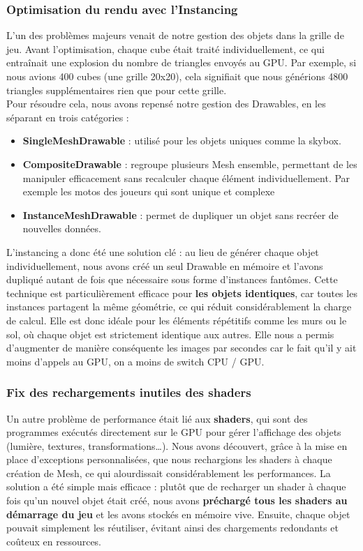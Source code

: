 \subsubsection{Optimisation du rendu avec l’Instancing}
L’un des problèmes majeurs venait de notre gestion des objets dans la grille de jeu. Avant l’optimisation, chaque cube était traité individuellement, ce qui entraînait une explosion du nombre de triangles envoyés au GPU. Par exemple, si nous avions 400 cubes (une grille 20x20), cela signifiait que nous générions 4800 triangles supplémentaires rien que pour cette grille. \\
\newline
Pour résoudre cela, nous avons repensé notre gestion des Drawables, en les séparant en trois catégories :
\begin{itemize}
    \item \textbf{SingleMeshDrawable} : utilisé pour les objets uniques comme la skybox.
    \item \textbf{CompositeDrawable} : regroupe plusieurs Mesh ensemble, permettant de les manipuler efficacement sans recalculer chaque élément individuellement. Par exemple les motos des joueurs qui sont unique et complexe
    \item \textbf{InstanceMeshDrawable} : permet de dupliquer un objet sans recréer de nouvelles données.
\end{itemize}
L’instancing a donc été une solution clé : au lieu de générer chaque objet individuellement, nous avons créé un seul Drawable en mémoire et l’avons dupliqué autant de fois que nécessaire sous forme d’instances fantômes. Cette technique est particulièrement efficace pour \textbf{les objets identiques}, car toutes les instances partagent la même géométrie, ce qui réduit considérablement la charge de calcul. Elle est donc idéale pour les éléments répétitifs comme les murs ou le sol, où chaque objet est strictement identique aux autres. Elle nous a permis d'augmenter de manière conséquente les images par secondes car le fait qu’il y ait moins d'appels au GPU, on a moins de switch CPU / GPU.

\subsubsection{Fix des rechargements inutiles des shaders}
Un autre problème de performance était lié aux \textbf{shaders}, qui sont des programmes exécutés directement sur le GPU pour gérer l’affichage des objets (lumière, textures, transformations…). Nous avons découvert, grâce à la mise en place d’exceptions personnalisées, que nous rechargions les shaders à chaque création de Mesh, ce qui alourdissait considérablement les performances.
La solution a été simple mais efficace : plutôt que de recharger un shader à chaque fois qu’un nouvel objet était créé, nous avons \textbf{préchargé tous les shaders au démarrage du jeu} et les avons stockés en mémoire vive. Ensuite, chaque objet pouvait simplement les réutiliser, évitant ainsi des chargements redondants et coûteux en ressources.
